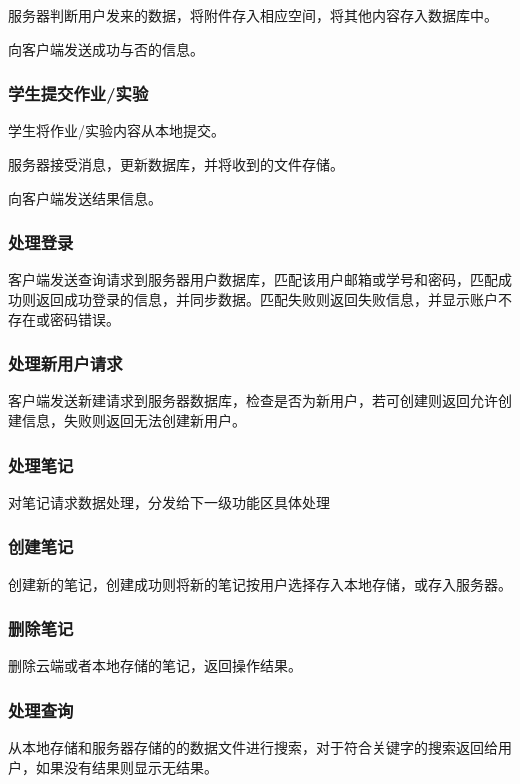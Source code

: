 服务器判断用户发来的数据，将附件存入相应空间，将其他内容存入数据库中。

向客户端发送成功与否的信息。

\subsubsection{学生提交作业/实验}
学生将作业/实验内容从本地提交。

服务器接受消息，更新数据库，并将收到的文件存储。

向客户端发送结果信息。

\subsubsection{处理登录}
客户端发送查询请求到服务器用户数据库，匹配该用户邮箱或学号和密码，匹配成功则返回成功登录的信息，并同步数据。匹配失败则返回失败信息，并显示账户不存在或密码错误。

\subsubsection{处理新用户请求}
客户端发送新建请求到服务器数据库，检查是否为新用户，若可创建则返回允许创建信息，失败则返回无法创建新用户。

\subsubsection{处理笔记}
对笔记请求数据处理，分发给下一级功能区具体处理

\subsubsection{创建笔记}
创建新的笔记，创建成功则将新的笔记按用户选择存入本地存储，或存入服务器。

\subsubsection{删除笔记}
删除云端或者本地存储的笔记，返回操作结果。

\subsubsection{处理查询}
从本地存储和服务器存储的的数据文件进行搜索，对于符合关键字的搜索返回给用户，如果没有结果则显示无结果。

